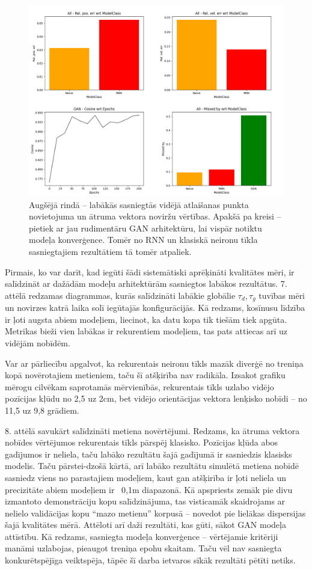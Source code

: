 \documentclass[12pt, a4paper]{article}
\numberwithin{equation}{section} %
\begin{document}
\begin{figure}[t!]
    \centering
    \includegraphics[width=16cm,page=1]{../img/throw_metrics_gan.png}
    \caption{Augšējā rindā -- labākās sasniegtās vidējā atlaišanas punkta novietojuma un ātruma vektora noviržu vērtības. Apakšā pa kreisi -- pietiek ar jau rudimentāru GAN arhitektūru, lai vispār notiktu modeļa konverģence. Tomēr no RNN un klasiskā neironu tīkla sasniegtajiem rezultātiem tā tomēr atpaliek.}
\end{figure}

Pirmais, ko var darīt, kad iegūti šādi sistemātiski aprēķināti kvalitātes mēri, ir salīdzināt ar dažādām modeļu arhitektūrām sasniegtos labākos rezultātus. 7. attēlā redzamas diagrammas, kurās salīdzināti labākie globālie $\tau_d, \tau_g$ tuvības mēri un novirzes katrā laika solī iegūtajās konfigurācijās. Kā redzams, kosīnusu līdzība ir ļoti augsta abiem modeļiem, liecinot, ka datu kopa tik tiešām tiek apgūta. Metrikas bieži vien labākas ir rekurentiem modeļiem, tas pats attiecas arī uz vidējām nobīdēm. 

Var ar pārliecību apgalvot, ka rekurentais neironu tīkls mazāk diverģē no treniņa kopā novērotajiem metieniem, taču šī atšķirība nav radikāla. Izsakot grafiku mērogu cilvēkam saprotamās mērvienībās, rekurentais tīkls uzlabo vidējo pozīcijas kļūdu no 2,5 uz 2cm, bet vidējo orientācijas vektora lenķisko nobīdi -- no 11,5 uz 9,8 grādiem.

8. attēlā savukārt salīdzināti metiena novērtējumi. Redzams, ka ātruma vektora nobīdes vērtējumos rekurentais tīkls pārspēj klasisko. Pozīcijas kļūda abos gadījumos ir neliela, taču labāko rezultātu šajā gadījumā ir sasniedzis klasisks modelis. Taču pārstei-dzošā kārtā, arī labāko rezultātu simulētā metiena nobīdē sasniedz viens no parastajiem modeļiem, kaut gan atšķirība ir ļoti neliela un precizitāte abiem modeļiem ir ~0,1m diapazonā. Kā apspriests zemāk pie divu izmantoto demonstrāciju kopu salīdzinājuma, tas visticamāk skaidrojams ar nelielo validācijas kopu ``mazo metienu'' korpusā -- novedot pie lielākas dispersijas šajā kvalitātes mērā. Attēloti arī daži rezultāti, kas gūti, sākot GAN modeļa attīstību. Kā redzams, sasniegta modeļa konverģence -- vērtējamie kritēriji manāmi uzlabojas, pieaugot treniņa epohu skaitam. Taču vēl nav sasniegta konkurētspējīga veiktspēja, tāpēc šī darba ietvaros sīkāk rezultāti pētīti netiks. 
\end{document}
